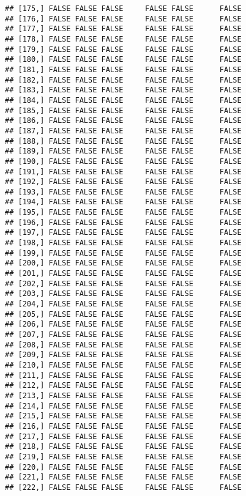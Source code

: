 \documentclass[
]{article}
\begin{document}
\begin{verbatim}
## [175,] FALSE FALSE FALSE     FALSE FALSE      FALSE
## [176,] FALSE FALSE FALSE     FALSE FALSE      FALSE
## [177,] FALSE FALSE FALSE     FALSE FALSE      FALSE
## [178,] FALSE FALSE FALSE     FALSE FALSE      FALSE
## [179,] FALSE FALSE FALSE     FALSE FALSE      FALSE
## [180,] FALSE FALSE FALSE     FALSE FALSE      FALSE
## [181,] FALSE FALSE FALSE     FALSE FALSE      FALSE
## [182,] FALSE FALSE FALSE     FALSE FALSE      FALSE
## [183,] FALSE FALSE FALSE     FALSE FALSE      FALSE
## [184,] FALSE FALSE FALSE     FALSE FALSE      FALSE
## [185,] FALSE FALSE FALSE     FALSE FALSE      FALSE
## [186,] FALSE FALSE FALSE     FALSE FALSE      FALSE
## [187,] FALSE FALSE FALSE     FALSE FALSE      FALSE
## [188,] FALSE FALSE FALSE     FALSE FALSE      FALSE
## [189,] FALSE FALSE FALSE     FALSE FALSE      FALSE
## [190,] FALSE FALSE FALSE     FALSE FALSE      FALSE
## [191,] FALSE FALSE FALSE     FALSE FALSE      FALSE
## [192,] FALSE FALSE FALSE     FALSE FALSE      FALSE
## [193,] FALSE FALSE FALSE     FALSE FALSE      FALSE
## [194,] FALSE FALSE FALSE     FALSE FALSE      FALSE
## [195,] FALSE FALSE FALSE     FALSE FALSE      FALSE
## [196,] FALSE FALSE FALSE     FALSE FALSE      FALSE
## [197,] FALSE FALSE FALSE     FALSE FALSE      FALSE
## [198,] FALSE FALSE FALSE     FALSE FALSE      FALSE
## [199,] FALSE FALSE FALSE     FALSE FALSE      FALSE
## [200,] FALSE FALSE FALSE     FALSE FALSE      FALSE
## [201,] FALSE FALSE FALSE     FALSE FALSE      FALSE
## [202,] FALSE FALSE FALSE     FALSE FALSE      FALSE
## [203,] FALSE FALSE FALSE     FALSE FALSE      FALSE
## [204,] FALSE FALSE FALSE     FALSE FALSE      FALSE
## [205,] FALSE FALSE FALSE     FALSE FALSE      FALSE
## [206,] FALSE FALSE FALSE     FALSE FALSE      FALSE
## [207,] FALSE FALSE FALSE     FALSE FALSE      FALSE
## [208,] FALSE FALSE FALSE     FALSE FALSE      FALSE
## [209,] FALSE FALSE FALSE     FALSE FALSE      FALSE
## [210,] FALSE FALSE FALSE     FALSE FALSE      FALSE
## [211,] FALSE FALSE FALSE     FALSE FALSE      FALSE
## [212,] FALSE FALSE FALSE     FALSE FALSE      FALSE
## [213,] FALSE FALSE FALSE     FALSE FALSE      FALSE
## [214,] FALSE FALSE FALSE     FALSE FALSE      FALSE
## [215,] FALSE FALSE FALSE     FALSE FALSE      FALSE
## [216,] FALSE FALSE FALSE     FALSE FALSE      FALSE
## [217,] FALSE FALSE FALSE     FALSE FALSE      FALSE
## [218,] FALSE FALSE FALSE     FALSE FALSE      FALSE
## [219,] FALSE FALSE FALSE     FALSE FALSE      FALSE
## [220,] FALSE FALSE FALSE     FALSE FALSE      FALSE
## [221,] FALSE FALSE FALSE     FALSE FALSE      FALSE
## [222,] FALSE FALSE FALSE     FALSE FALSE      FALSE

\end{verbatim}
\end{document}
